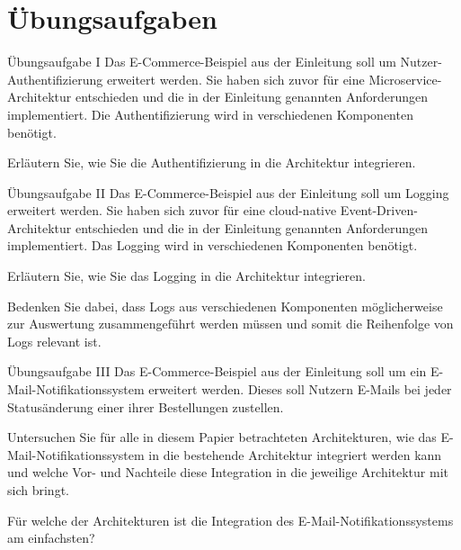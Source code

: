 \section{Übungsaufgaben}

\begin{frame}{Übungsaufgabe I}
    Das E-Commerce-Beispiel aus der Einleitung soll um Nutzer-Authentifizierung erweitert werden.
    Sie haben sich zuvor für eine Microservice-Architektur entschieden und die in der Einleitung genannten Anforderungen implementiert.
    Die Authentifizierung wird in verschiedenen Komponenten benötigt.

    Erläutern Sie, wie Sie die Authentifizierung in die Architektur integrieren.
\end{frame}

\begin{frame}{Übungsaufgabe II}
    Das E-Commerce-Beispiel aus der Einleitung soll um Logging erweitert werden.
    Sie haben sich zuvor für eine cloud-native Event-Driven-Architektur entschieden und die in der Einleitung genannten Anforderungen implementiert.
    Das Logging wird in verschiedenen Komponenten benötigt.

    Erläutern Sie, wie Sie das Logging in die Architektur integrieren.

    Bedenken Sie dabei, dass Logs aus verschiedenen Komponenten möglicherweise zur Auswertung zusammengeführt werden müssen und somit die Reihenfolge von Logs relevant ist.
\end{frame}

\begin{frame}{Übungsaufgabe III}
    Das E-Commerce-Beispiel aus der Einleitung soll um ein E-Mail-Notifikationssystem erweitert werden.
    Dieses soll Nutzern E-Mails bei jeder Statusänderung einer ihrer Bestellungen zustellen.

    Untersuchen Sie für alle in diesem Papier betrachteten Architekturen, wie das E-Mail-Notifikationssystem in die bestehende Architektur integriert werden kann
    und welche Vor- und Nachteile diese Integration in die jeweilige Architektur mit sich bringt.

    Für welche der Architekturen ist die Integration des E-Mail-Notifikationssystems am einfachsten?
\end{frame}